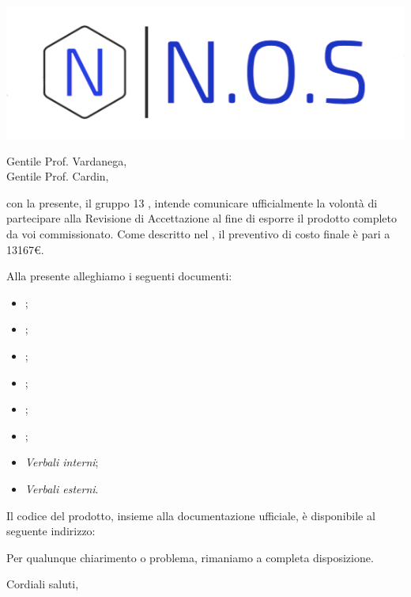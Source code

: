 \documentclass[12pt]{letter}
\date{19 maggio 2021}
\begin{document}
\begin{letter}{ }

\includegraphics[scale=1.5
]{../../../Immagini/N.O.S.jpg}

\opening{Gentile Prof. Vardanega,\\ Gentile Prof. Cardin, }

con la presente, il gruppo 13  \Gruppo, intende comunicare ufficialmente la volontà di partecipare alla Revisione di Accettazione al fine di esporre il prodotto completo da voi commissionato. Come descritto nel , il preventivo di costo finale è pari a 13167\euro. 

Alla presente alleghiamo i seguenti documenti:

\begin{itemize}
	\item {};
	\item {};
	\item {};
	\item {};
	\item {};
	\item {};
	\item \textit{Verbali interni};
	\item \textit{Verbali esterni}.
\end{itemize}

Il codice del prodotto, insieme alla documentazione ufficiale, è disponibile al seguente indirizzo: \\


Per qualunque chiarimento o problema, rimaniamo a completa disposizione.
\closing{Cordiali saluti, }

\vspace{2em}

\end{letter}
\end{document}

